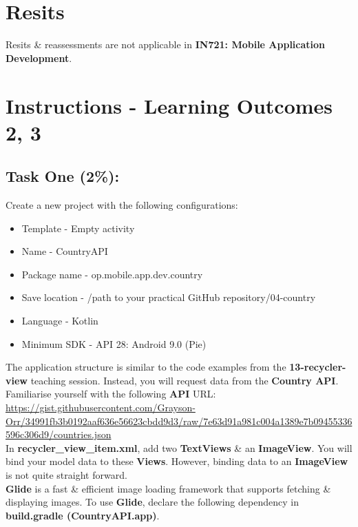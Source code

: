 \documentclass{article}
\begin{document}
\section*{Resits}
Resits \& reassessments are not applicable in \textbf{IN721: Mobile Application Development}.

\section*{Instructions - Learning Outcomes 2, 3}
\subsection*{Task One (2\%):}
Create a new project with the following configurations:
\begin{itemize}
	\item Template - Empty activity
	\item Name - CountryAPI
	\item Package name - op.mobile.app.dev.country
	\item Save location - /path to your practical GitHub repository/04-country
	\item Language - Kotlin
	\item Minimum SDK - API 28: Android 9.0 (Pie) 
\end{itemize} 

The application structure is similar to the code examples from the \textbf{13-recycler-view} teaching session. Instead, you will request data from the \textbf{Country API}. \\

Familiarise yourself with the following \textbf{API} URL: \\

\href{https://gist.githubusercontent.com/Grayson-Orr/34991fb3b0192aaf636e56623cbdd9d3/raw/7e63d91a981c004a1389e7b09455336596c306d9/countries.json}{https://gist.githubusercontent.com/Grayson-Orr/34991fb3b0192aaf636e56623cbdd9d3/raw/7e63d91a981c004a1389e7b09455336596c306d9/countries.json} \\

In \textbf{recycler\_view\_item.xml}, add two \textbf{TextViews} \& an \textbf{ImageView}. You will bind your model data to these \textbf{Views}. However, binding data to an \textbf{ImageView} is not quite straight forward.  \\

\textbf{Glide} is a fast \& efficient image loading framework that supports fetching \& displaying images. To use \textbf{Glide}, declare the following dependency in \textbf{build.gradle (CountryAPI.app)}.
\end{document}
